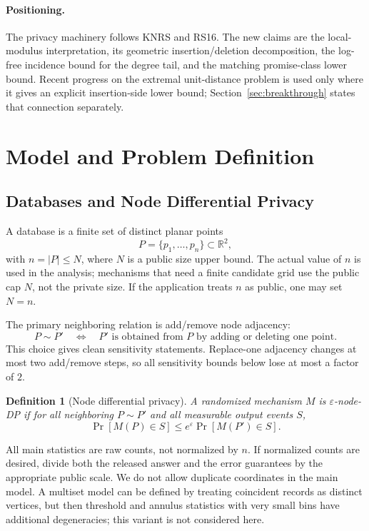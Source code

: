 \documentclass[11pt]{article}
\newtheorem{definition}[theorem]{Definition}
\newcommand{\R}{\mathbb{R}}
\newcommand{\eps}{\varepsilon}
\begin{document}
\paragraph{Positioning.}
The privacy machinery follows KNRS and RS16. The new claims are the local-modulus interpretation, its geometric insertion/deletion decomposition, the log-free incidence bound for the degree tail, and the matching promise-class lower bound. Recent progress on the extremal unit-distance problem is used only where it gives an explicit insertion-side lower bound; Section~\ref{sec:breakthrough} states that connection separately.

\section{Model and Problem Definition}

\subsection{Databases and Node Differential Privacy}

A database is a finite set of distinct planar points
\[
P=\{p_1,\ldots,p_n\}\subset \R^2,
\]
with \(n=|P|\le N\), where \(N\) is a public size upper bound. The actual value of \(n\) is used in the analysis; mechanisms that need a finite candidate grid use the public cap \(N\), not the private size. If the application treats \(n\) as public, one may set \(N=n\).

The primary neighboring relation is add/remove node adjacency:
\[
P\sim P' \quad\Longleftrightarrow\quad P' \text{ is obtained from } P \text{ by adding or deleting one point.}
\]
This choice gives clean sensitivity statements. Replace-one adjacency changes at most two add/remove steps, so all sensitivity bounds below lose at most a factor of \(2\).

\begin{definition}[Node differential privacy]
A randomized mechanism \(M\) is \(\eps\)-node-DP if for all neighboring \(P\sim P'\) and all measurable output events \(S\),
\[
\Pr[M(P)\in S]\le e^\eps \Pr[M(P')\in S].
\]
\end{definition}

All main statistics are raw counts, not normalized by \(n\). If normalized counts are desired, divide both the released answer and the error guarantees by the appropriate public scale. We do not allow duplicate coordinates in the main model. A multiset model can be defined by treating coincident records as distinct vertices, but then threshold and annulus statistics with very small bins have additional degeneracies; this variant is not considered here.
\end{document}
